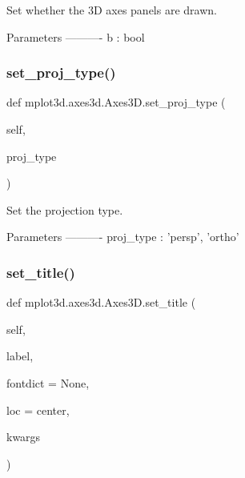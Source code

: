 \begin{DoxyVerb}
\begin{DoxyVerb}Set whether the 3D axes panels are drawn.

Parameters
----------
b : bool
\end{DoxyVerb}
 \mbox{\label{classmplot3d_1_1axes3d_1_1Axes3D_a5c6865830a1e5dfa1957cab491569633}} 
\subsubsection{\texorpdfstring{set\+\_\+proj\+\_\+type()}{set\_proj\_type()}}
{\footnotesize\ttfamily def mplot3d.\+axes3d.\+Axes3\+D.\+set\+\_\+proj\+\_\+type (\begin{DoxyParamCaption}\item[{}]{self,  }\item[{}]{proj\+\_\+type }\end{DoxyParamCaption})}

\begin{DoxyVerb}Set the projection type.

Parameters
----------
proj_type : {'persp', 'ortho'}
\end{DoxyVerb}
 \mbox{\label{classmplot3d_1_1axes3d_1_1Axes3D_ac5cefc2e2da989a7d26605c6654fde86}} 
\subsubsection{\texorpdfstring{set\+\_\+title()}{set\_title()}}
{\footnotesize\ttfamily def mplot3d.\+axes3d.\+Axes3\+D.\+set\+\_\+title (\begin{DoxyParamCaption}\item[{}]{self,  }\item[{}]{label,  }\item[{}]{fontdict = {\ttfamily None},  }\item[{}]{loc = {\ttfamily \textquotesingle{}center\textquotesingle{}},  }\item[{}]{kwargs }\end{DoxyParamCaption})}


\end{DoxyVerb}
